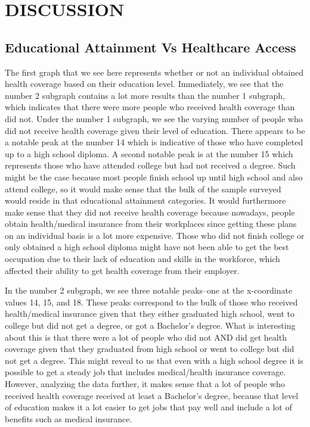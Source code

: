 \documentclass[10pt,]{article}
\begin{document}
\section{DISCUSSION}\label{discussion}

\subsection{\texorpdfstring{\textbf{Educational Attainment Vs Healthcare
Access}}{Educational Attainment Vs Healthcare Access}}\label{educational-attainment-vs-healthcare-access-1}

The first graph that we see here represents whether or not an individual
obtained health coverage based on their education level. Immediately, we
see that the number 2 subgraph contains a lot more results than the
number 1 subgraph, which indicates that there were more people who
received health coverage than did not. Under the number 1 subgraph, we
see the varying number of people who did not receive health coverage
given their level of education. There appears to be a notable peak at
the number 14 which is indicative of those who have completed up to a
high school diploma. A second notable peak is at the number 15 which
represents those who have attended college but had not received a
degree. Such might be the case because most people finish school up
until high school and also attend college, so it would make sense that
the bulk of the sample surveyed would reside in that educational
attainment categories. It would furthermore make sense that they did not
receive health coverage because nowadays, people obtain health/medical
insurance from their workplaces since getting these plans on an
individual basis is a lot more expensive. Those who did not finish
college or only obtained a high school diploma might have not been able
to get the best occupation due to their lack of education and skills in
the workforce, which affected their ability to get health coverage from
their employer.

In the number 2 subgraph, we see three notable peaks--one at the
x-coordinate values 14, 15, and 18. These peaks correspond to the bulk
of those who received health/medical insurance given that they either
graduated high school, went to college but did not get a degree, or got
a Bachelor's degree. What is interesting about this is that there were a
lot of people who did not AND did get health coverage given that they
graduated from high school or went to college but did not get a degree.
This might reveal to us that even with a high school degree it is
possible to get a steady job that includes medical/health insurance
coverage. However, analyzing the data further, it makes sense that a lot
of people who received health coverage received at least a Bachelor's
degree, because that level of education makes it a lot easier to get
jobs that pay well and include a lot of benefits such as medical
insurance.
\end{document}
